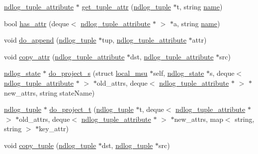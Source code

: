 \begin{DoxyCompactItemize}
\item 
\hyperlink{structndlog__tuple__attribute}{ndlog\-\_\-tuple\-\_\-attribute} $\ast$ \hyperlink{helper-function_8h_a4d7e8bda6fe9e0195da6c80951077f42}{get\-\_\-tuple\-\_\-attr} (\hyperlink{structndlog__tuple}{ndlog\-\_\-tuple} $\ast$t, string \hyperlink{http__parser_8c_a8f8f80d37794cde9472343e4487ba3eb}{name})
\item 
bool \hyperlink{helper-function_8h_a7ba40978a7c6904ea85168981299da89}{has\-\_\-attr} (deque$<$ \hyperlink{structndlog__tuple__attribute}{ndlog\-\_\-tuple\-\_\-attribute} $\ast$ $>$ $\ast$a, string \hyperlink{http__parser_8c_a8f8f80d37794cde9472343e4487ba3eb}{name})
\item 
void \hyperlink{helper-function_8h_afdd669347d9fea1e3d9f3e1cdd1ede08}{do\-\_\-append} (\hyperlink{structndlog__tuple}{ndlog\-\_\-tuple} $\ast$tup, \hyperlink{structndlog__tuple__attribute}{ndlog\-\_\-tuple\-\_\-attribute} $\ast$attr)
\item 
void \hyperlink{helper-function_8h_a5da3f4446e98fbe68949cf2521996730}{copy\-\_\-attr} (\hyperlink{structndlog__tuple__attribute}{ndlog\-\_\-tuple\-\_\-attribute} $\ast$dst, \hyperlink{structndlog__tuple__attribute}{ndlog\-\_\-tuple\-\_\-attribute} $\ast$src)
\item 
\hyperlink{structndlog__state}{ndlog\-\_\-state} $\ast$ \hyperlink{helper-function_8h_a20885005d76692c36c0af920a9ca58c0}{do\-\_\-project\-\_\-s} (struct \hyperlink{structlocal__msu}{local\-\_\-msu} $\ast$self, \hyperlink{structndlog__state}{ndlog\-\_\-state} $\ast$s, deque$<$ \hyperlink{structndlog__tuple__attribute}{ndlog\-\_\-tuple\-\_\-attribute} $\ast$ $>$ $\ast$old\-\_\-attrs, deque$<$ \hyperlink{structndlog__tuple__attribute}{ndlog\-\_\-tuple\-\_\-attribute} $\ast$ $>$ $\ast$new\-\_\-attrs, string state\-Name)
\item 
\hyperlink{structndlog__tuple}{ndlog\-\_\-tuple} $\ast$ \hyperlink{helper-function_8h_afffd163f6938cde2285249a95e7a1e38}{do\-\_\-project\-\_\-t} (\hyperlink{structndlog__tuple}{ndlog\-\_\-tuple} $\ast$t, deque$<$ \hyperlink{structndlog__tuple__attribute}{ndlog\-\_\-tuple\-\_\-attribute} $\ast$ $>$ $\ast$old\-\_\-attrs, deque$<$ \hyperlink{structndlog__tuple__attribute}{ndlog\-\_\-tuple\-\_\-attribute} $\ast$ $>$ $\ast$new\-\_\-attrs, map$<$ string, string $>$ $\ast$key\-\_\-attr)
\item 
void \hyperlink{helper-function_8h_ae1c240522c5fe714f798814dc0ad92e1}{copy\-\_\-tuple} (\hyperlink{structndlog__tuple}{ndlog\-\_\-tuple} $\ast$dst, \hyperlink{structndlog__tuple}{ndlog\-\_\-tuple} $\ast$src)

\end{DoxyCompactItemize}
